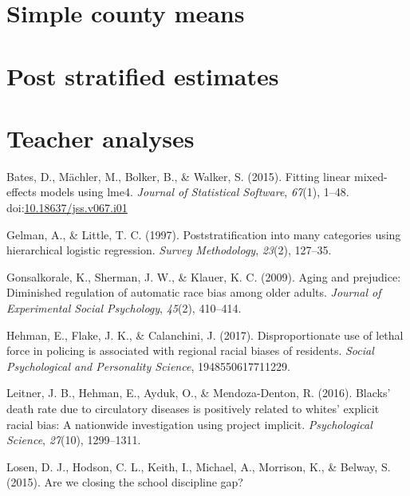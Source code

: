 \documentclass[english,floatsintext,man]{apa6}
\theoremstyle{definition}
\theoremstyle{definition}
\theoremstyle{remark}
\begin{document}
\section{Simple county means}\label{simple-county-means}

\section{Post stratified estimates}\label{post-stratified-estimates}

\section{Teacher analyses}\label{teacher-analyses}

\setlength{\parindent}{-0.5in} \setlength{\leftskip}{0.5in}

\hypertarget{refs}{}
\hypertarget{ref-bates2015fitting}{}
Bates, D., Mächler, M., Bolker, B., \& Walker, S. (2015). Fitting linear
mixed-effects models using lme4. \emph{Journal of Statistical Software},
\emph{67}(1), 1--48.
doi:\href{https://doi.org/10.18637/jss.v067.i01}{10.18637/jss.v067.i01}

\hypertarget{ref-gelman1997poststratification}{}
Gelman, A., \& Little, T. C. (1997). Poststratification into many
categories using hierarchical logistic regression. \emph{Survey
Methodology}, \emph{23}(2), 127--35.

\hypertarget{ref-gonsalkorale2009aging}{}
Gonsalkorale, K., Sherman, J. W., \& Klauer, K. C. (2009). Aging and
prejudice: Diminished regulation of automatic race bias among older
adults. \emph{Journal of Experimental Social Psychology}, \emph{45}(2),
410--414.

\hypertarget{ref-hehman2017disproportionate}{}
Hehman, E., Flake, J. K., \& Calanchini, J. (2017). Disproportionate use
of lethal force in policing is associated with regional racial biases of
residents. \emph{Social Psychological and Personality Science},
1948550617711229.

\hypertarget{ref-leitner2016blacks}{}
Leitner, J. B., Hehman, E., Ayduk, O., \& Mendoza-Denton, R. (2016).
Blacks' death rate due to circulatory diseases is positively related to
whites' explicit racial bias: A nationwide investigation using project
implicit. \emph{Psychological Science}, \emph{27}(10), 1299--1311.

\hypertarget{ref-losen2015we}{}
Losen, D. J., Hodson, C. L., Keith, I., Michael, A., Morrison, K., \&
Belway, S. (2015). Are we closing the school discipline gap?
\end{document}
